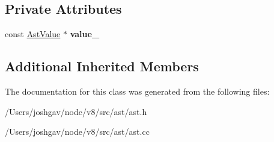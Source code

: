 \subsection*{Private Attributes}
\begin{DoxyCompactItemize}
\item 
const \hyperlink{classv8_1_1internal_1_1_ast_value}{Ast\+Value} $\ast$ {\bfseries value\+\_\+}\hypertarget{classv8_1_1internal_1_1_literal_a3d07d8366db34141bdac43aa55d74bb9}{}\label{classv8_1_1internal_1_1_literal_a3d07d8366db34141bdac43aa55d74bb9}

\end{DoxyCompactItemize}
\subsection*{Additional Inherited Members}


The documentation for this class was generated from the following files\+:\begin{DoxyCompactItemize}
\item 
/\+Users/joshgav/node/v8/src/ast/ast.\+h\item 
/\+Users/joshgav/node/v8/src/ast/ast.\+cc\end{DoxyCompactItemize}
